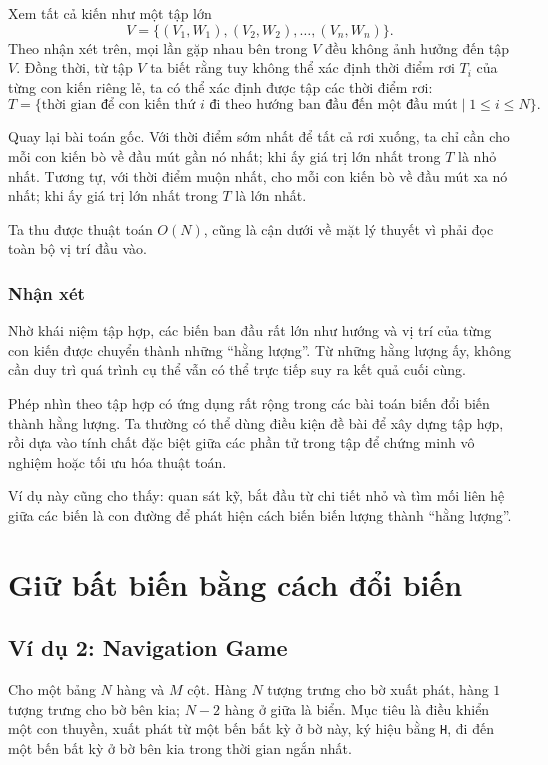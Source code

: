\documentclass[11pt]{article}
\begin{document}
Xem tất cả kiến như một tập lớn
\[
  V=\{(V_1,W_1),(V_2,W_2),\ldots,(V_n,W_n)\}.
\]
Theo nhận xét trên, mọi lần gặp nhau bên trong $V$ đều không ảnh hưởng đến
tập $V$. Đồng thời, từ tập $V$ ta biết rằng tuy không thể xác định thời điểm
rơi $T_i$ của từng con kiến riêng lẻ, ta có thể xác định được tập các thời
điểm rơi:
\[
  T=\{\text{thời gian để con kiến thứ }i\text{ đi theo hướng ban đầu đến một
  đầu mút}\mid 1\le i\le N\}.
\]

Quay lại bài toán gốc. Với thời điểm sớm nhất để tất cả rơi xuống, ta chỉ cần
cho mỗi con kiến bò về đầu mút gần nó nhất; khi ấy giá trị lớn nhất trong $T$
là nhỏ nhất. Tương tự, với thời điểm muộn nhất, cho mỗi con kiến bò về đầu mút
xa nó nhất; khi ấy giá trị lớn nhất trong $T$ là lớn nhất.

Ta thu được thuật toán $O(N)$, cũng là cận dưới về mặt lý thuyết vì phải đọc
toàn bộ vị trí đầu vào.

\subsubsection*{Nhận xét}

Nhờ khái niệm tập hợp, các biến ban đầu rất lớn như hướng và vị trí của từng
con kiến được chuyển thành những ``hằng lượng''. Từ những hằng lượng ấy, không
cần duy trì quá trình cụ thể vẫn có thể trực tiếp suy ra kết quả cuối cùng.

Phép nhìn theo tập hợp có ứng dụng rất rộng trong các bài toán biến đổi biến
thành hằng lượng. Ta thường có thể dùng điều kiện đề bài để xây dựng tập hợp,
rồi dựa vào tính chất đặc biệt giữa các phần tử trong tập để chứng minh vô
nghiệm hoặc tối ưu hóa thuật toán.

Ví dụ này cũng cho thấy: quan sát kỹ, bắt đầu từ chi tiết nhỏ và tìm mối liên
hệ giữa các biến là con đường để phát hiện cách biến biến lượng thành
``hằng lượng''.

\section{Giữ bất biến bằng cách đổi biến}

\subsection{Ví dụ 2: Navigation Game}

Cho một bảng $N$ hàng và $M$ cột. Hàng $N$ tượng trưng cho bờ xuất phát, hàng
$1$ tượng trưng cho bờ bên kia; $N-2$ hàng ở giữa là biển. Mục tiêu là điều
khiển một con thuyền, xuất phát từ một bến bất kỳ ở bờ này, ký hiệu bằng
\texttt{H}, đi đến một bến bất kỳ ở bờ bên kia trong thời gian ngắn nhất.
\end{document}
